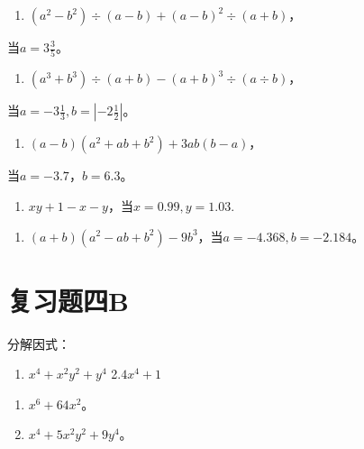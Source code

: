 \begin{enumerate}[start=56]
\item
  \((a^2 - b^2) \div (a - b) + (a - b)^2 \div (a + b)\)，
\end{enumerate}
当\(a = 3\frac{3}{5}\)。

\begin{enumerate}[start=57]
\item
  \((a^3 + b^3) \div (a + b) - (a + b)^3 \div (a \div b)\)，
\end{enumerate}
当\(a = -3\frac{1}{3}, b = \left| -2\frac{1}{2} \right|\)。

\begin{enumerate}[start=58]
\item
  \((a - b)(a^2 + ab + b^2) + 3ab(b - a)\)，
\end{enumerate}
当\(a = -3.7\)，\(b = 6.3\)。

\begin{enumerate}[start=59]
\item
  \(xy + 1 - x - y\)，当\(x = 0.99, y = 1.03.\)
\end{enumerate}

\begin{enumerate}[start=60]
\item
  \((a + b)(a^2 - ab + b^2) - 9b^3\)，当\(a = -4.368, b = -2.184\)。
\end{enumerate}

\section{复习题四B}

分解因式：

\begin{enumerate}[start=1]
\item
  \(x^{4} + x^{2}y^{2} + y^{4}\) 2.\(4x^{4} + 1\)
\end{enumerate}

\begin{enumerate}[start=3]
\item
  \(x^{6} + 64x^{2}\)。
\item
  \(x^{4} + 5x^{2}y^{2} + 9y^{4}\)。
\end{enumerate}

